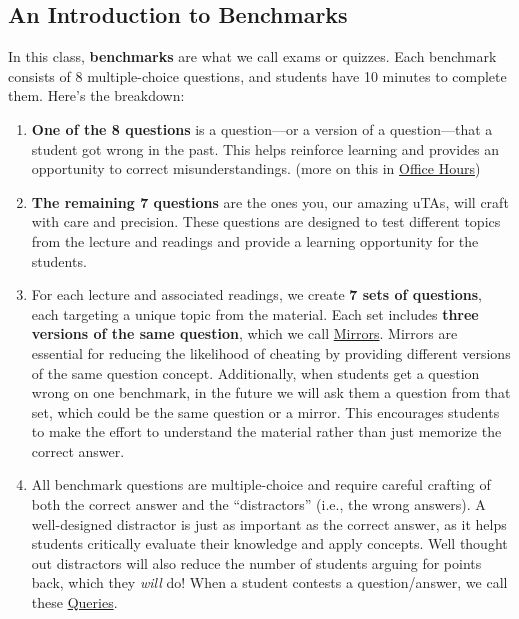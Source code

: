 \documentclass[
]{article}
\providecommand{\tightlist}{%
  \setlength{\itemsep}{0pt}\setlength{\parskip}{0pt}}
\begin{document}
\hypertarget{an-introduction-to-benchmarks}{%
\subsection{An Introduction to Benchmarks}\label{an-introduction-to-benchmarks}}

In this class, \textbf{benchmarks} are what we call exams or quizzes. Each benchmark consists of 8 multiple-choice questions, and students have 10 minutes to complete them. Here's the breakdown:

\begin{enumerate}
\def\labelenumi{\arabic{enumi}.}
\tightlist
\item
  \textbf{One of the 8 questions} is a question---or a version of a question---that a student got wrong in the past. This helps reinforce learning and provides an opportunity to correct misunderstandings. (more on this in \protect\hyperlink{office-hours}{Office Hours})
\item
  \textbf{The remaining 7 questions} are the ones you, our amazing uTAs, will craft with care and precision. These questions are designed to test different topics from the lecture and readings and provide a learning opportunity for the students.
\item
  For each lecture and associated readings, we create \textbf{7 sets of questions}, each targeting a unique topic from the material. Each set includes \textbf{three versions of the same question}, which we call \protect\hyperlink{mirrors-how-and-why}{Mirrors}. Mirrors are essential for reducing the likelihood of cheating by providing different versions of the same question concept. Additionally, when students get a question wrong on one benchmark, in the future we will ask them a question from that set, which could be the same question or a mirror. This encourages students to make the effort to understand the material rather than just memorize the correct answer.
\item
  All benchmark questions are multiple-choice and require careful crafting of both the correct answer and the ``distractors'' (i.e., the wrong answers). A well-designed distractor is just as important as the correct answer, as it helps students critically evaluate their knowledge and apply concepts. Well thought out distractors will also reduce the number of students arguing for points back, which they \emph{will} do! When a student contests a question/answer, we call these \protect\hyperlink{benchmark-queries}{Queries}.
\end{enumerate}
\end{document}
